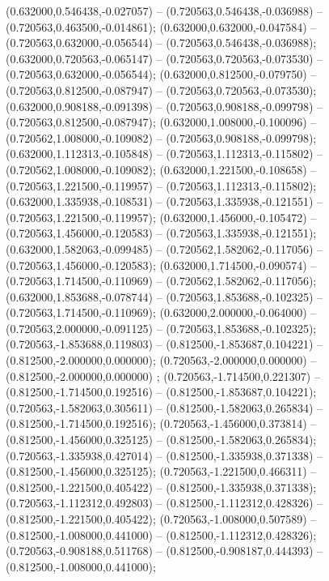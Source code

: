  (0.632000,0.546438,-0.027057) -- (0.720563,0.546438,-0.036988) -- (0.720563,0.463500,-0.014861);
 (0.632000,0.632000,-0.047584) -- (0.720563,0.632000,-0.056544) -- (0.720563,0.546438,-0.036988);
 (0.632000,0.720563,-0.065147) -- (0.720563,0.720563,-0.073530) -- (0.720563,0.632000,-0.056544);
 (0.632000,0.812500,-0.079750) -- (0.720563,0.812500,-0.087947) -- (0.720563,0.720563,-0.073530);
 (0.632000,0.908188,-0.091398) -- (0.720563,0.908188,-0.099798) -- (0.720563,0.812500,-0.087947);
 (0.632000,1.008000,-0.100096) -- (0.720562,1.008000,-0.109082) -- (0.720563,0.908188,-0.099798);
 (0.632000,1.112313,-0.105848) -- (0.720563,1.112313,-0.115802) -- (0.720562,1.008000,-0.109082);
 (0.632000,1.221500,-0.108658) -- (0.720563,1.221500,-0.119957) -- (0.720563,1.112313,-0.115802);
 (0.632000,1.335938,-0.108531) -- (0.720563,1.335938,-0.121551) -- (0.720563,1.221500,-0.119957);
 (0.632000,1.456000,-0.105472) -- (0.720563,1.456000,-0.120583) -- (0.720563,1.335938,-0.121551);
 (0.632000,1.582063,-0.099485) -- (0.720562,1.582062,-0.117056) -- (0.720563,1.456000,-0.120583);
 (0.632000,1.714500,-0.090574) -- (0.720563,1.714500,-0.110969) -- (0.720562,1.582062,-0.117056);
 (0.632000,1.853688,-0.078744) -- (0.720563,1.853688,-0.102325) -- (0.720563,1.714500,-0.110969);
 (0.632000,2.000000,-0.064000) -- (0.720563,2.000000,-0.091125) -- (0.720563,1.853688,-0.102325);
 (0.720563,-1.853688,0.119803) -- (0.812500,-1.853687,0.104221) -- (0.812500,-2.000000,0.000000);
 (0.720563,-2.000000,0.000000) -- (0.812500,-2.000000,0.000000) ;
 (0.720563,-1.714500,0.221307) -- (0.812500,-1.714500,0.192516) -- (0.812500,-1.853687,0.104221);
 (0.720563,-1.582063,0.305611) -- (0.812500,-1.582063,0.265834) -- (0.812500,-1.714500,0.192516);
 (0.720563,-1.456000,0.373814) -- (0.812500,-1.456000,0.325125) -- (0.812500,-1.582063,0.265834);
 (0.720563,-1.335938,0.427014) -- (0.812500,-1.335938,0.371338) -- (0.812500,-1.456000,0.325125);
 (0.720563,-1.221500,0.466311) -- (0.812500,-1.221500,0.405422) -- (0.812500,-1.335938,0.371338);
 (0.720563,-1.112312,0.492803) -- (0.812500,-1.112312,0.428326) -- (0.812500,-1.221500,0.405422);
 (0.720563,-1.008000,0.507589) -- (0.812500,-1.008000,0.441000) -- (0.812500,-1.112312,0.428326);
 (0.720563,-0.908188,0.511768) -- (0.812500,-0.908187,0.444393) -- (0.812500,-1.008000,0.441000);
